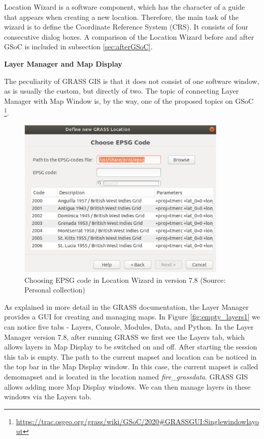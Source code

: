 \documentclass[a4paper,10pt,twoside]{article}
\begin{document}
\noindent Location Wizard is a software component, which has the
character of a guide that appears when creating a new
location. Therefore, the main task of the wizard is to define the
Coordinate Reference System (CRS). It consists of four consecutive
dialog boxes. A comparison of the Location Wizard before and after
GSoC is included in subsection \ref{sec:afterGSoC}.

\bigskip
\noindent \textbf {Layer Manager and Map Display}

\noindent The peculiarity of GRASS GIS is that it does not consist of
one software window, as is usually the custom, but directly of
two. The topic of connecting Layer Manager with Map Window is, by the
way, one of the proposed topics on GSoC
\footnote{\url{https://trac.osgeo.org/grass/wiki/GSoC/2020\#GRASSGUI:Singlewindowlayout}}.

\vspace{0.3cm}
\begin{figure}[hbt!]
\begin{center}
\includegraphics[width=10cm]{../pictures/loc_wizard_sour_pred.png} 
\caption[Choosing EPSG code in Location Wizard in version 7.8]{Choosing EPSG code in Location Wizard in version 7.8 (Source: Personal collection)}
\label{fig:loc_wizard_sour_pred}
\end{center}
\end{figure}

\newpage
\noindent As explained in more detail in the GRASS documentation, the
Layer Manager provides a GUI for creating and managing maps. In Figure
\ref{fig:empty_layers1} we can notice five tabs - Layers, Console,
Modules, Data, and Python.  In the Layer Manager version 7.8, after
running GRASS we first see the Layers tab, which allows layers in Map
Display to be switched on and off. After starting the session this tab
is empty. The path to the current mapset and location can be noticed
in the top bar in the Map Display window. In this case, the current
mapset is called demomapset and is located in the location named
\textit{fire\_grassdata}. GRASS GIS allows adding more Map Display
windows. We can then manage layers in these windows via the Layers
tab.
\end{document}
